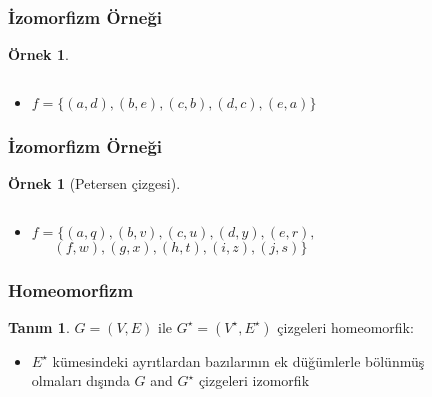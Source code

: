 \documentclass[dvipsnames]{beamer}
\theoremstyle{definition}
\newtheorem{tanim}[theorem]{Tanım}
\theoremstyle{example}
\newtheorem{ornek}[theorem]{Örnek}
\theoremstyle{plain}
\begin{document}
\begin{frame}
  \frametitle{İzomorfizm Örneği}

  \begin{ornek}
    \begin{columns}
      \begin{center}
      \end{center}

      \begin{center}
      \end{center}
    \end{columns}

    \pause
    \bigskip
    \begin{itemize}
      \item $f = \{(a,d),(b,e),(c,b),(d,c),(e,a)\}$
    \end{itemize}
  \end{ornek}
\end{frame}

\begin{frame}
  \frametitle{İzomorfizm Örneği}

  \begin{ornek}[Petersen çizgesi]
    \begin{columns}
      \begin{center}
      \end{center}

      \begin{center}
      \end{center}
    \end{columns}

    \bigskip
    \begin{itemize}
      \item $f = \{(a,q),(b,v),(c,u),(d,y),(e,r),$\\
        $~~~~~~~(f,w),(g,x),(h,t),(i,z),(j,s)\}$
    \end{itemize}
  \end{ornek}
\end{frame}

\begin{frame}
  \frametitle{Homeomorfizm}

  \begin{tanim}
    $G=(V,E)$ ile $G^\star=(V^\star,E^\star)$ çizgeleri \alert{homeomorfik}:
    \begin{itemize}
      \item $E^\star$ kümesindeki ayrıtlardan bazılarının ek düğümlerle bölünmüş\\
        olmaları dışında $G$ and $G^\star$ çizgeleri izomorfik
    \end{itemize}
  \end{tanim}
\end{frame}
\end{document}
